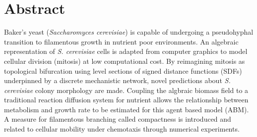 \chapter{Abstract}
Baker's yeast (\textit{Saccharomyces cerevisiae}) is capable 
of undergoing a pseudohyphal transition to filamentous growth in nutrient poor environments.
An algebraic representation of \textit{S. cerevisiae} cells is adapted from
computer graphics to model cellular division (mitosis) at low computational cost.
By reimagining mitosis as topological bifurcation using level sections 
of signed distance functions (SDFs) underpinned by a discrete mechanistic network, 
novel predictions about 
\textit{S. cerevisiae} colony morphology are made. Coupling 
the algbraic biomass field to a traditional reaction diffusion system 
for nutrient allows the relationship between metabolism 
and growth rate to be estimated for this agent based 
model (ABM). A measure for filamentous branching called compactness 
is introduced and related to cellular mobility under chemotaxis through
numerical experiments.  
